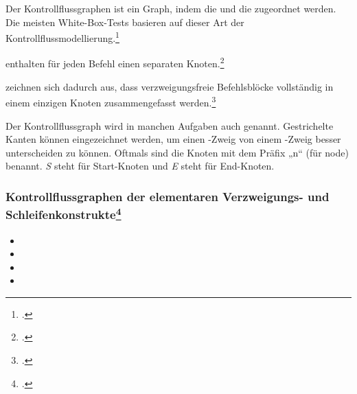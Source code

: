 \documentclass{lehramt-informatik-haupt}
\begin{document}
Der  Kontrollﬂussgraphen ist ein Graph, indem
die  und die
 zugeordnet werden. Die
meisten White-Box-Tests basieren auf dieser Art der
Kontrollﬂussmodellierung.\footcite[Seite 203]{hoffmann:software}

 enthalten für jeden Befehl einen
separaten Knoten.\footcite[Seite 204]{hoffmann:software}

 zeichnen sich dadurch aus, dass
verzweigungsfreie Befehlsblöcke vollständig in einem einzigen Knoten
zusammengefasst werden.\footcite[Seite 204]{hoffmann:software}

Der Kontrollflussgraph wird in manchen Aufgaben auch
 genannt. Gestrichelte Kanten können
eingezeichnet werden, um einen -Zweig von einem
-Zweig besser unterscheiden zu können. Oftmals sind die
Knoten mit dem Präfix „n“ (für node) benannt. \emph{S} steht für
Start-Knoten und \emph{E} steht für End-Knoten.

\subsubsection{Kontrollflussgraphen der elementaren Verzweigungs- und
Schleifenkonstrukte\footcite[Seite 205]{hoffmann:software}}

\begin{itemize}
\item {}

\item {}

\item {}

\item {}
\end{itemize}

\begin{multicols}{2}

\end{multicols}
\end{document}
